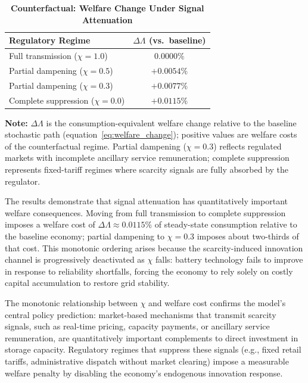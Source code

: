 	\begin{table}[H]
		\centering
		\caption[Counterfactual: Welfare Change Under Signal Attenuation]{\textbf{Counterfactual: Welfare Change Under Signal Attenuation}}
		\label{tab:counterfactual}
		\renewcommand{\arraystretch}{1.3}
		\begin{tabular}{l c}
			\toprule
			\textbf{Regulatory Regime} & \textbf{$\Delta\Lambda$ (vs.\ baseline)} \\
			\midrule
			Full transmission ($\chi = 1.0$) & $0.0000\%$ \\
			Partial dampening ($\chi = 0.5$) & $+0.0054\%$ \\
			Partial dampening ($\chi = 0.3$) & $+0.0077\%$ \\
			Complete suppression ($\chi = 0.0$) & $+0.0115\%$ \\
			\bottomrule
		\end{tabular}
		\vspace{0.2cm}
		\parbox{\textwidth}{\footnotesize \textbf{Note:} $\Delta\Lambda$ is the consumption-equivalent welfare change relative to the baseline stochastic path (equation~\ref{eq:welfare_change}); positive values are welfare costs of the counterfactual regime. Partial dampening ($\chi = 0.3$) reflects regulated markets with incomplete ancillary service remuneration; complete suppression represents fixed-tariff regimes where scarcity signals are fully absorbed by the regulator.}
	\end{table}

	The results demonstrate that signal attenuation has quantitatively important welfare consequences. Moving from full transmission to complete suppression imposes a welfare cost of $\Delta\Lambda \approx 0.0115\%$ of steady-state consumption relative to the baseline economy; partial dampening to $\chi = 0.3$ imposes about two-thirds of that cost. This monotonic ordering arises because the scarcity-induced innovation channel is progressively deactivated as $\chi$ falls: battery technology fails to improve in response to reliability shortfalls, forcing the economy to rely solely on costly capital accumulation to restore grid stability.

	The monotonic relationship between $\chi$ and welfare cost confirms the model's central policy prediction: market-based mechanisms that transmit scarcity signals, such as real-time pricing, capacity payments, or ancillary service remuneration, are quantitatively important complements to direct investment in storage capacity. Regulatory regimes that suppress these signals (e.g., fixed retail tariffs, administrative dispatch without market clearing) impose a measurable welfare penalty by disabling the economy's endogenous innovation response.


